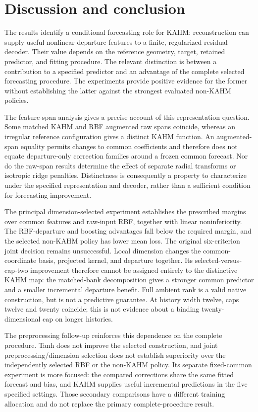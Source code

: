 \section{Discussion and conclusion}\label{sec:discussion}

The results identify a conditional forecasting role for KAHM:
reconstruction can supply useful nonlinear departure features to a
finite, regularized residual decoder. Their value depends on the
reference geometry, target, retained predictor, and fitting procedure.
The relevant distinction is between a contribution to a specified
predictor and an advantage of the complete selected forecasting
procedure. The experiments provide positive evidence for the former
without establishing the latter against the strongest evaluated
non-KAHM policies.

The feature-span analysis gives a precise account of this
representation question. Some matched KAHM and RBF augmented raw spans
coincide, whereas an irregular reference configuration gives a distinct
KAHM function. An augmented-span equality permits changes to common
coefficients and therefore does not equate departure-only correction
families around a frozen common forecast. Nor do the raw-span results
determine the effect of separate radial transforms or isotropic ridge
penalties. Distinctness is consequently a property to characterize
under the specified representation and decoder, rather than a
sufficient condition for forecasting improvement.

The principal dimension-selected experiment establishes the prescribed
margins over common features and raw-input RBF, together with linear
noninferiority. The RBF-departure and boosting advantages fall below
the required margin, and the selected non-KAHM policy has lower mean
loss. The original six-criterion joint decision remains unsuccessful.
Local dimension changes the common-coordinate basis, projected kernel,
and departure together. Its selected-versus-cap-two improvement
therefore cannot be assigned entirely to the distinctive KAHM map:
the matched-bank decomposition gives a stronger common predictor and
a smaller incremental departure benefit. Full ambient rank is a valid
native construction, but is not a predictive guarantee. At history
width twelve, caps twelve and twenty coincide; this is not evidence
about a binding twenty-dimensional cap on longer histories.

The preprocessing follow-up reinforces this dependence on the complete
procedure. Tanh does not improve the selected construction, and joint
preprocessing/dimension selection does not establish superiority over
the independently selected RBF or the non-KAHM policy. Its separate
fixed-common experiment is more focused: the compared corrections share
the same fitted forecast and bias, and KAHM supplies useful incremental
predictions in the five specified settings. Those secondary comparisons
have a different training allocation and do not replace the primary
complete-procedure result.

